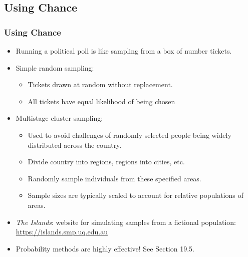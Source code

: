 \documentclass[t]{beamer}
\begin{document}
\subsection{Using Chance}
\begin{frame}
\frametitle{Using Chance}

\footnotesize
\begin{itemize}
\item Running a political poll is like sampling from a box of number tickets.
\item Simple random sampling:  
    \begin{itemize}
    \item \footnotesize Tickets drawn at random without replacement.
    \item \footnotesize  All tickets have equal likelihood of being chosen
    \end{itemize}
\item Multistage cluster sampling:
    \begin{itemize}
    \item \footnotesize Used to avoid challenges of randomly selected people being
          widely distributed across the country.
    \item \footnotesize Divide country into regions, regions into cities, etc.
    \item \footnotesize Randomly sample individuals from these specified areas.
    \item \footnotesize 
     Sample sizes are typically scaled to account for  relative populations of areas.
    \end{itemize}
\item \textit{The Islands}:  website for simulating samples from a fictional population:
\href{https://islands.smp.uq.edu.au}{https://islands.smp.uq.edu.au}
\item Probability methods are highly effective!  See Section 19.5.
\end{itemize}


\end{frame}
\end{document}
